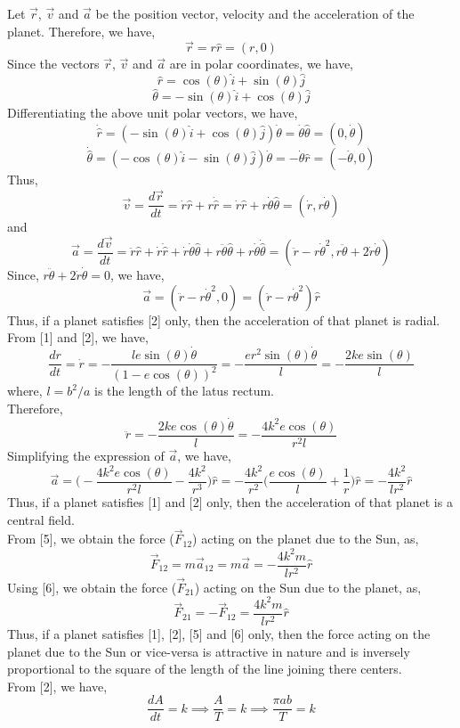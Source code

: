 \documentclass[12pt]{article}
\begin{document}
Let $\vec r$, $\vec v$ and $\vec a$ be the position vector, velocity and the acceleration of the planet. Therefore, we have,
$$\vec r = r\hat r = (r,0)$$
Since the vectors $\vec r$, $\vec v$ and $\vec a$ are in polar coordinates, we have,
$$\hat r = \cos(\theta)\hat i+\sin(\theta)\hat j$$
$$\hat \theta = -\sin(\theta)\hat i+\cos(\theta)\hat j$$
Differentiating the above unit polar vectors, we have,
$$\dot{\hat r} = (-\sin(\theta)\hat i+\cos(\theta)\hat j)\dot\theta = \dot\theta\hat\theta = (0,\dot\theta)$$
$$\dot{\hat \theta} = (-\cos(\theta)\hat i-\sin(\theta)\hat j)\dot\theta = -\dot\theta\hat r = (-\dot\theta,0)$$
Thus,
$$\vec v = \frac{d\vec r}{dt} = \dot r\hat r+r\dot{\hat r} = \dot r\hat r+r\dot\theta\hat\theta = (\dot r,r\dot\theta)$$
and 
$$\vec a = \frac{d\vec v}{dt} = \ddot r\hat r + \dot r\dot{\hat r} + \dot r\dot\theta\hat\theta + r\ddot\theta\hat\theta + r\dot\theta\dot{\hat\theta}=(\ddot r-r\dot\theta^2,r\ddot\theta+2\dot r\dot\theta)$$
Since, $r\ddot{\theta}+2\dot r\dot\theta=0$, we have,
$$\vec a =(\ddot r-r\dot\theta^2,0) = (\ddot r-r\dot\theta^2)\hat r $$
Thus, if a planet satisfies [2] only, then the acceleration of that planet is radial.\\
From [1] and [2], we have,
$$\frac{dr}{dt} = \dot r = -\frac{le\sin(\theta)\dot\theta}{(1-e\cos(\theta))^2} = -\frac{er^2\sin(\theta)\dot\theta}{l} = -\frac{2ke\sin(\theta)}{l}$$
where, $l=b^2/a$ is the length of the latus rectum.\\
Therefore,
$$\ddot r = -\frac{2ke\cos(\theta)\dot\theta}{l}=-\frac{4k^2e\cos(\theta)}{r^2l}$$
Simplifying the expression of $\vec a$, we have,
$$\vec a = \Bigg(-\frac{4k^2e\cos(\theta)}{r^2l}-\frac{4k^2}{r^3}\Bigg)\hat r = -\frac{4k^2}{r^2}\Bigg(\frac{e\cos(\theta)}{l}+\frac{1}{r}\Bigg)\hat r = -\frac{4k^2}{lr^2}\hat r$$
Thus, if a planet satisfies [1] and [2] only, then the acceleration of that planet is a central field.\\
From [5], we obtain the force ($\vec F_{12}$) acting on the planet due to the Sun, as,
$$\vec F_{12} = m\vec a_{12} = m\vec a = -\frac{4k^2m}{lr^2}\hat r$$
Using [6], we obtain the force ($\vec F_{21}$) acting on the Sun due to the planet, as,
$$\vec F_{21} = -\vec F_{12} = \frac{4k^2m}{lr^2}\hat r$$
Thus, if a planet satisfies [1], [2], [5] and [6] only, then the force acting on the planet due to the Sun or vice-versa is attractive in nature and is inversely proportional to the square of the length of the line joining there centers.\\
From [2], we have,
$$\frac{dA}{dt} = k \implies \frac{A}{T} = k \implies \frac{\pi ab}{T} = k$$
\end{document}
